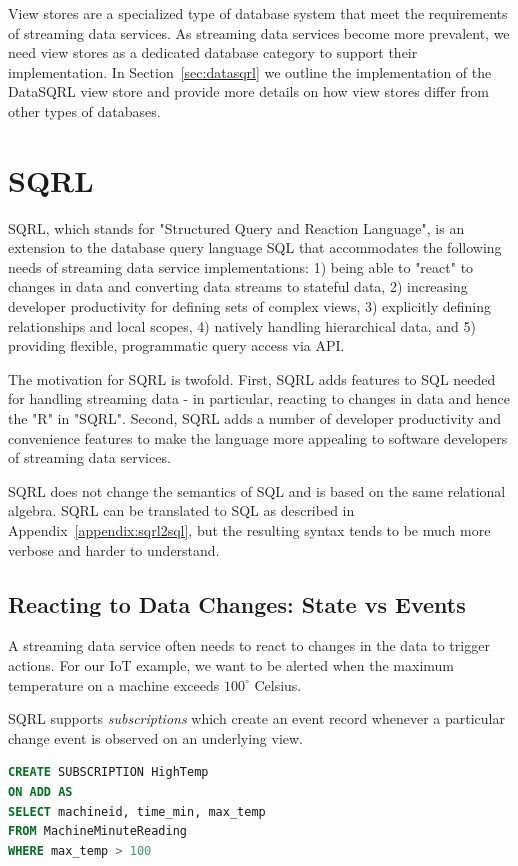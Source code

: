 \documentclass[	DIV=calc,%
							paper=letter,%
							fontsize=11pt,%
							twocolumn]{scrartcl}	 					%
\begin{document}
View stores are a specialized type of database system that meet the requirements of streaming data services. As streaming data services become more prevalent, we need view stores as a dedicated database category to support their implementation.
In Section~\ref{sec:datasqrl} we outline the implementation of the DataSQRL view store and provide more details on how view stores differ from other types of databases.

\section{SQRL}
\label{sec:sqrl}

SQRL, which stands for "Structured Query and Reaction Language", is an extension to the database query language SQL that accommodates the following needs of streaming data service implementations: 1) being able to "react" to changes in data and converting data streams to stateful data, 2) increasing developer productivity for defining sets of complex views, 3) explicitly defining relationships and local scopes, 4) natively handling hierarchical data, and 5) providing flexible, programmatic query access via API.

The motivation for SQRL is twofold. First, SQRL adds features to SQL needed for handling streaming data - in particular, reacting to changes in data and hence the "R" in "SQRL".
Second, SQRL adds a number of developer productivity and convenience features to make the language more appealing to software developers of streaming data services.

SQRL does not change the semantics of SQL and is based on the same relational algebra. SQRL can be translated to SQL as described in Appendix~\ref{appendix:sqrl2sql}, but the resulting syntax tends to be much more verbose and harder to understand.

\subsection{Reacting to Data Changes: State vs Events}

A streaming data service often needs to react to changes in the data to trigger actions.
For our IoT example, we want to be alerted when the maximum temperature on a machine exceeds $100^{\circ}$ Celsius.

SQRL supports \emph{subscriptions} which create an event record whenever a particular change event is observed on an underlying view.

\begin{lstlisting}[language=SQL]
CREATE SUBSCRIPTION HighTemp
ON ADD AS
SELECT machineid, time_min, max_temp
FROM MachineMinuteReading
WHERE max_temp > 100
\end{lstlisting}
\end{document}
